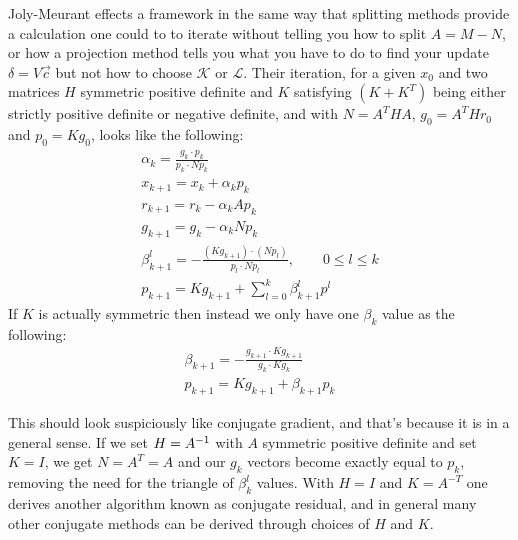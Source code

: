 \documentclass[11pt]{article}
\begin{document}
Joly-Meurant effects a framework in the same way that splitting methods provide a calculation one could to to iterate without telling you how to split $A = M - N$, or how a projection method tells you what you have to do to find your update $\delta = V \vec c$ but not how to choose $\mathcal K$ or $\mathcal L$. Their iteration, for a given $x_0$ and two matrices $H$ symmetric positive definite and $K$ satisfying $(K+K^T)$ being either strictly positive definite or negative definite, and with $N = A^T H A$, $g_0 = A^T H r_0$ and $p_0 = K g_0$, looks like the following: \begin{gather*}
\alpha_k = \frac{g_k \cdot p_k}{p_k \cdot N p_k} \\
x_{k+1} = x_k + \alpha_k p_k \\
r_{k+1} = r_k - \alpha_k A p_k \\
g_{k+1} = g_k - \alpha_k N p_k \\
\beta_{k+1}^l = - \frac{(K g_{k+1}) \cdot (N p_l)}{p_l \cdot N p_l}, \hspace{2em} 0 \le l \le k \\
p_{k+1} = K g_{k+1} + \sum_{l = 0}^k \beta_{k+1}^l p^l 
\end{gather*}
If $K$ is actually symmetric then instead we only have one $\beta_k$ value as the following:\begin{gather*}
\beta_{k+1} = - \frac{g_{k+1} \cdot K g_{k+1}}{g_k \cdot K g_k} \\
p_{k+1} = K g_{k+1} + \beta_{k+1} p_k 
\end{gather*}

This should look suspiciously like conjugate gradient, and that's because it is in a general sense. If we set $H = A^{-1}$ with $A$ symmetric positive definite and set $K = I$, we get $N = A^T = A$ and our $g_k$ vectors become exactly equal to $p_k$, removing the need for the triangle of $\beta_k^l$ values. With $H = I$ and $K = A^{-T}$ one derives another algorithm known as conjugate residual, and in general many other conjugate methods can be derived through choices of $H$ and $K$.
\end{document}
